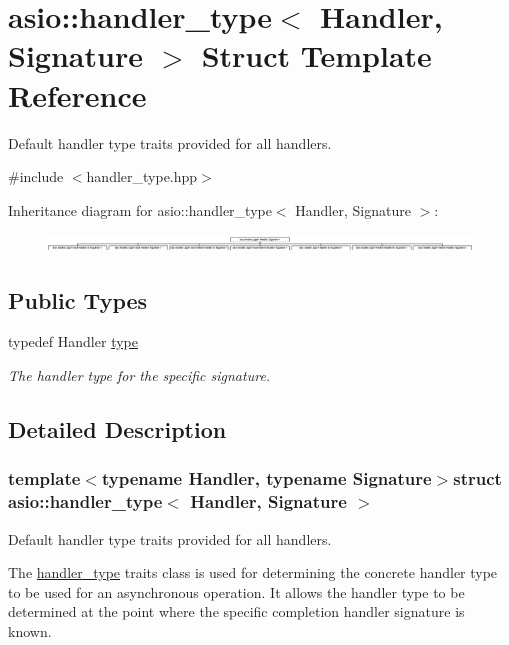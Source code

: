 \hypertarget{structasio_1_1handler__type}{}\section{asio\+:\+:handler\+\_\+type$<$ Handler, Signature $>$ Struct Template Reference}
\label{structasio_1_1handler__type}


Default handler type traits provided for all handlers.  




{\ttfamily \#include $<$handler\+\_\+type.\+hpp$>$}

Inheritance diagram for asio\+:\+:handler\+\_\+type$<$ Handler, Signature $>$\+:\begin{figure}[H]
\begin{center}
\leavevmode
\includegraphics[height=0.458453cm]{structasio_1_1handler__type}
\end{center}
\end{figure}
\subsection*{Public Types}
\begin{DoxyCompactItemize}
\item 
typedef Handler \hyperlink{structasio_1_1handler__type_af26f1822b7ff708de592f20a12b140fc}{type}
\begin{DoxyCompactList}\small\item\em The handler type for the specific signature. \end{DoxyCompactList}\end{DoxyCompactItemize}


\subsection{Detailed Description}
\subsubsection*{template$<$typename Handler, typename Signature$>$struct asio\+::handler\+\_\+type$<$ Handler, Signature $>$}

Default handler type traits provided for all handlers. 

The \hyperlink{structasio_1_1handler__type}{handler\+\_\+type} traits class is used for determining the concrete handler type to be used for an asynchronous operation. It allows the handler type to be determined at the point where the specific completion handler signature is known.


